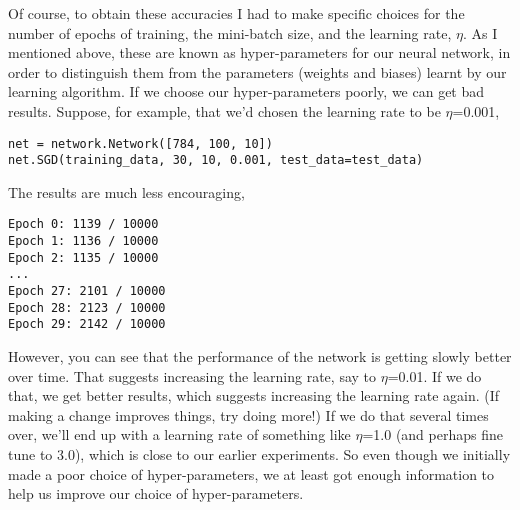 Of course, to obtain these accuracies I had to make specific choices for the number of epochs of training, the mini-batch size, and the learning rate, $\eta$. As I mentioned above, these are known as hyper-parameters for our neural network, in order to distinguish them from the parameters (weights and biases) learnt by our learning algorithm. If we choose our hyper-parameters poorly, we can get bad results. Suppose, for example, that we'd chosen the learning rate to be $\eta$=0.001,
\begin{lstlisting}
net = network.Network([784, 100, 10])
net.SGD(training_data, 30, 10, 0.001, test_data=test_data)
\end{lstlisting}
The results are much less encouraging,
\begin{lstlisting}
Epoch 0: 1139 / 10000
Epoch 1: 1136 / 10000
Epoch 2: 1135 / 10000
...
Epoch 27: 2101 / 10000
Epoch 28: 2123 / 10000
Epoch 29: 2142 / 10000
\end{lstlisting}
However, you can see that the performance of the network is getting slowly better over time. That suggests increasing the learning rate, say to $\eta$=0.01. If we do that, we get better results, which suggests increasing the learning rate again. (If making a change improves things, try doing more!) If we do that several times over, we'll end up with a learning rate of something like $\eta$=1.0 (and perhaps fine tune to 3.0), which is close to our earlier experiments. So even though we initially made a poor choice of hyper-parameters, we at least got enough information to help us improve our choice of hyper-parameters.

